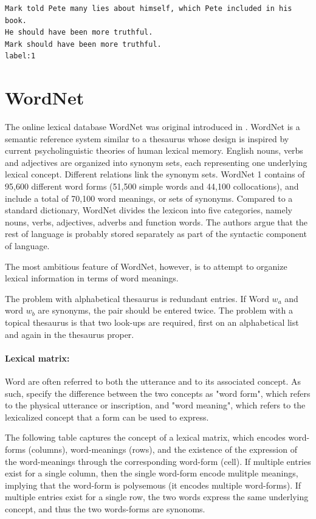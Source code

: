 \documentclass[a4paper,12pt,twoside,openright]{report}
\begin{document}
\begin{verbatim}
Mark told Pete many lies about himself, which Pete included in his book. 
He should have been more truthful.	
Mark should have been more truthful.
label:1
\end{verbatim}


\section{WordNet}

The online lexical database WordNet was original introduced in \cite{miller90}.
WordNet is a semantic reference system similar to a thesaurus whose design is inspired by current psycholinguistic theories of human lexical memory.
English nouns, verbs and adjectives are organized into synonym sets, each representing one underlying lexical concept.
Different relations link the synonym sets.
WordNet 1 contains of 95,600 different word forms (51,500 simple words and 44,100 collocations), and include a total of 70,100 word meanings, or sets of synonyms.
Compared to a standard dictionary, WordNet divides the lexicon into five categories, namely nouns, verbs, adjectives, adverbs and function words. 
The authors argue that the rest of language is probably stored separately as part of the syntactic component of language.

The most ambitious feature of WordNet, however, is to attempt to organize lexical information in terms of word meanings.

The problem with alphabetical thesaurus is redundant entries. If Word $w_a$ and word $w_b$ are synonyms, the pair should be entered twice.
The problem with a topical thesaurus is that two look-ups are required, first on an alphabetical list and again in the thesaurus proper.

\paragraph{Lexical matrix:} 
Word are often referred to both the utterance and to its associated concept.
As such, \cite{miller90} specify the difference between the two concepts as "word form", which refers to the physical utterance or inscription, and "word meaning", which refers to the lexicalized concept that a form can be used to express.

The following table captures the concept of a lexical matrix, which encodes word-forms (columns), word-meanings (rows), and the existence of the expression of the word-meanings through the corresponding word-form (cell).
If multiple entries exist for a single column, then the single word-form encode mulitple meanings, implying that the word-form is polysemous (it encodes multiple word-forms).
If multiple entries exist for a single row, the two words express the same underlying concept, and thus the two words-forms are synonoms.
\end{document}

